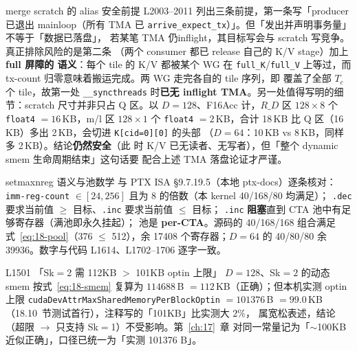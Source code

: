 \begin{kaogu}[F3·论证链补强]{merge scratch 的 alias 安全前提}
  L2003--2011 列出三条前提，第一条写「producer 已退出 mainloop（所有 TMA 已
  \texttt{arrive\_\allowbreak{}expect\_\allowbreak{}tx}）」。但「发出并声明事务量」不等于「数据已落盘」，
  若某笔 TMA 仍inflight，其目标写会与 scratch 写竞争。真正排除风险的是第二条
  （两个 consumer 都已 release 自己的 K/V stage）加上\textbf{full 屏障的
  语义}：每个 tile 的 K/V 都被某个 WG 在 \texttt{full\_K}/\texttt{full\_V}
  上等过，而 tx-count 归零意味着搬运完成。两 WG 走完各自的 tile 序列，即
  覆盖了全部 $T_c$ 个 tile，故第一处 \texttt{\_\allowbreak{}\_\allowbreak{}syncthreads} 时\textbf{已无
  inflight TMA}。另一处值得写明的细节：scratch 尺寸并非只占 Q 区。以
  $D{=}128$、F16Acc 计，$R\_D$ 区 $128 \times 8$ 个 \texttt{float4}
  $= 16$\,KB，m/l 区 $128 \times 1$ 个 \texttt{float4} $= 2$\,KB，合计
  18\,KB 比 Q 区（16\,KB）多出 2\,KB，会切进 \texttt{K[cid=0][0]} 的头部
  （$D{=}64$：10\,KB vs 8\,KB，同样多 2\,KB）。结论\textbf{仍然安全}（此
  时 K/V 已无读者、无写者），但「整个 dynamic smem 生命周期结束」这句话要
  配合上述 TMA 落盘论证才严谨。
\end{kaogu}

\begin{kaogu}[F2 核校通过]{setmaxnreg 语义与池数学}
  与 PTX ISA §9.7.19.5（本地 ptx-docs）逐条核对：\texttt{imm-reg-count}
  $\in [24, 256]$ 且为 8 的倍数（本 kernel 40/168/80 均满足）；
  \texttt{.dec} 要求当前值 $\ge$ 目标、\texttt{.inc} 要求当前值 $\le$ 目标；
  \texttt{.inc} \textbf{阻塞}直到 CTA 池中有足够寄存器（满池即永久挂起）；
  池是 \textbf{per-CTA}。源码的 40/168/168 组合满足
  式~\ref{eq:18-pool}（376 $\le$ 512），余 17408 个寄存器；$D{=}64$ 的
  40/80/80 余 39936。数字与代码 L1614、L1702--1706 逐字一致。
\end{kaogu}

\begin{kaogu}[F1·口径]{L1501 「Sk$=$2 需 112KB $>$ 101KB optin 上限」}
  $D{=}128$、Sk$=2$ 的动态 smem 按式~\ref{eq:18-smem} 复算为
  $114688$\,B $= 112$\,KB（正确）；但本机实测 optin 上限
  \texttt{cuda\allowbreak{}Dev\allowbreak{}Attr\allowbreak{}Max\allowbreak{}Shared\allowbreak{}Memory\allowbreak{}Per\allowbreak{}Block\allowbreak{}Optin} $= 101376$\,B
  $= 99.0$\,KB（18.10~节测试首行），注释写的「101KB」比实测大 $2\%$，
  属宽松表述，结论（超限 $\to$ 只支持 Sk$=$1）不受影响。第~\ref{ch:17}~章
  对同一常量记为「$\sim$100KB 近似正确」，口径已统一为「实测 101376 B」。
\end{kaogu}


